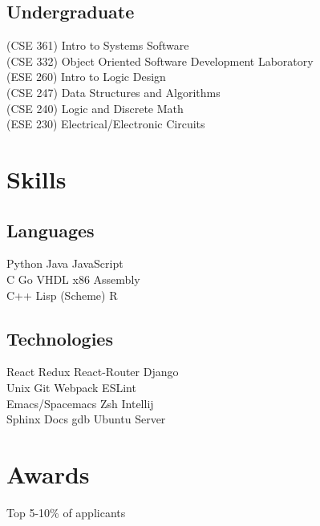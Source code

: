 \documentclass[]{deedy-resume-openfont}
\begin{document}
\begin{minipage}[t]{0.33\textwidth}
\subsection{Undergraduate}
(CSE 361) Intro to Systems Software\\
(CSE 332) Object Oriented Software Development Laboratory\\
(ESE 260) Intro to Logic Design\\
(CSE 247) Data Structures and Algorithms\\
(CSE 240) Logic and Discrete Math\\
(ESE 230) Electrical/Electronic Circuits\\
\sectionsep


\section{Skills}
\subsection{Languages}
Python \textbullet{} Java \textbullet{} JavaScript \\
C \textbullet{} Go \textbullet{} VHDL \textbullet{} x86 Assembly \\
C++ \textbullet{} Lisp (Scheme) \textbullet{} R\\
\sectionsep

\subsection{Technologies}
React \textbullet{} Redux \textbullet{} React-Router \textbullet{} Django \\
Unix \textbullet{} Git \textbullet{} Webpack \textbullet{} ESLint \\
Emacs/Spacemacs \textbullet{} Zsh \textbullet{} Intellij \\
Sphinx Docs \textbullet{} gdb \textbullet{} Ubuntu Server \\
\sectionsep


\section{Awards}
\vspace{\topsep} %
\begin{tightemize}
\item Top 5-10\% of applicants
\end{tightemize}


\end{minipage}
\end{document}
